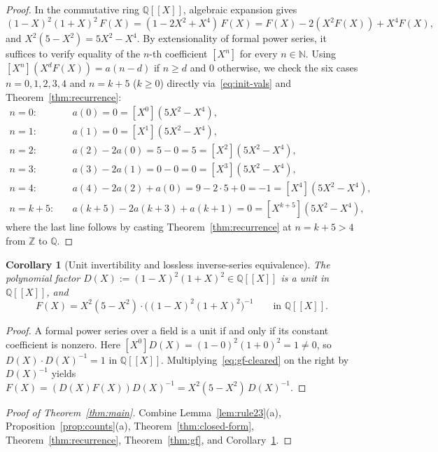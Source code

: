 \documentclass[11pt]{article}
\newcommand{\llbracket}{[\![}
\newcommand{\rrbracket}{]\!]}
\newtheorem{corollary}[theorem]{Corollary}
\theoremstyle{definition}
\newcommand{\N}{\mathbb{N}}
\newcommand{\Z}{\mathbb{Z}}
\newcommand{\Q}{\mathbb{Q}}
\begin{document}
\begin{proof}
In the commutative ring $\Q\llbracket X \rrbracket$, algebraic expansion gives
\[
(1 - X)^2 (1 + X)^2 \, F(X) = (1 - 2X^2 + X^4)\,F(X) = F(X) - 2(X^2 F(X)) + X^4 F(X),
\]
and $X^2(5 - X^2) = 5X^2 - X^4$. By extensionality of formal power series, it suffices to verify equality of the $n$-th coefficient $[X^n]$ for every $n \in \N$. Using $[X^n](X^d F(X)) = a(n - d)$ if $n \ge d$ and $0$ otherwise, we check the six cases $n = 0, 1, 2, 3, 4$ and $n = k + 5$ ($k \ge 0$) directly via~\eqref{eq:init-vals} and Theorem~\ref{thm:recurrence}:
\begin{align*}
n = 0:\quad & a(0) = 0 = [X^0](5X^2 - X^4), \\
n = 1:\quad & a(1) = 0 = [X^1](5X^2 - X^4), \\
n = 2:\quad & a(2) - 2a(0) = 5 - 0 = 5 = [X^2](5X^2 - X^4), \\
n = 3:\quad & a(3) - 2a(1) = 0 - 0 = 0 = [X^3](5X^2 - X^4), \\
n = 4:\quad & a(4) - 2a(2) + a(0) = 9 - 2\cdot 5 + 0 = -1 = [X^4](5X^2 - X^4), \\
n = k + 5:\quad & a(k + 5) - 2a(k + 3) + a(k + 1) = 0 = [X^{k+5}](5X^2 - X^4),
\end{align*}
where the last line follows by casting Theorem~\ref{thm:recurrence} at $n = k + 5 > 4$ from $\Z$ to $\Q$.
\end{proof}

\begin{corollary}[Unit invertibility and lossless inverse-series equivalence]
\label{cor:unit-inv}
The polynomial factor $D(X) := (1 - X)^2(1 + X)^2 \in \Q\llbracket X \rrbracket$ is a unit in $\Q\llbracket X \rrbracket$, and
\[
F(X) = X^2(5 - X^2) \cdot \bigl((1 - X)^2(1 + X)^2\bigr)^{-1} \qquad \text{in }\Q\llbracket X \rrbracket.
\]
\end{corollary}

\begin{proof}
A formal power series over a field is a unit if and only if its constant coefficient is nonzero. Here $[X^0]D(X) = (1 - 0)^2(1 + 0)^2 = 1 \ne 0$, so $D(X) \cdot D(X)^{-1} = 1$ in $\Q\llbracket X \rrbracket$. Multiplying~\eqref{eq:gf-cleared} on the right by $D(X)^{-1}$ yields $F(X) = (D(X) F(X)) D(X)^{-1} = X^2(5 - X^2)\,D(X)^{-1}$.
\end{proof}

\begin{proof}[Proof of Theorem~\ref{thm:main}]
Combine Lemma~\ref{lem:rule23}(a), Proposition~\ref{prop:counts}(a), Theorem~\ref{thm:closed-form}, Theorem~\ref{thm:recurrence}, Theorem~\ref{thm:gf}, and Corollary~\ref{cor:unit-inv}.
\end{proof}
\end{document}

